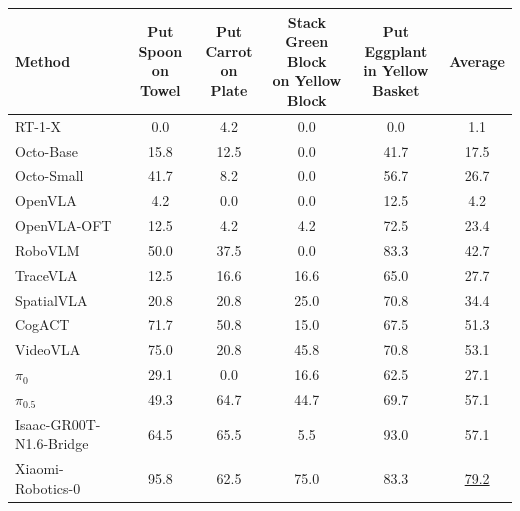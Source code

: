 \documentclass{llmxive}
\begin{document}
\begin{table}[!t]
  \centering
  \begin{adjustbox}{width=\linewidth}
  \begin{tabular}{l c c c c c}
    \toprule
    \textbf{Method}
     & \makecell[c]{\textbf{Put Spoon} \\ \textbf{on Towel}} 
     & \makecell[c]{\textbf{Put Carrot} \\ \textbf{on Plate}} 
     & \makecell[c]{\textbf{Stack Green Block} \\ \textbf{on Yellow Block}} 
     & \makecell[c]{\textbf{Put Eggplant} \\ \textbf{in Yellow Basket}} 
     & \textbf{Average} \\
    \midrule

    RT-1-X~\citep{OXE_2024_ICRA}         &  0.0  & 4.2   & 0.0   & 0.0   & 1.1 \\
    Octo-Base~\citep{Octo_2024_arXiv}       & 15.8  & 12.5  & 0.0   & 41.7  & 17.5 \\
    Octo-Small~\citep{Octo_2024_arXiv}      & 41.7  & 8.2   & 0.0   & 56.7  & 26.7 \\
    OpenVLA~\citep{OpenVLA_2024_CoRL}         & 4.2   & 0.0   & 0.0   & 12.5   & 4.2 \\
    OpenVLA-OFT~\citep{OpenVLA-OFT_2025_arXiv}     & 12.5  & 4.2  & 4.2  & 72.5  & 23.4 \\
    RoboVLM~\citep{RoboVLM_2024_arXiv}         & 50.0  & 37.5  & 0.0   & 83.3  & 42.7 \\ 
    TraceVLA~\citep{TraceVLA_2025_arXiv}        & 12.5  & 16.6  & 16.6  & 65.0  & 27.7 \\
    SpatialVLA~\citep{Spatialvla_2025_arXiv}      & 20.8  & 20.8  & 25.0  & 70.8  & 34.4 \\
    CogACT~\citep{CogACT_2024_arXiv}          & 71.7 &  50.8  & 15.0 & 67.5 & 51.3 \\
    VideoVLA~\citep{VideoVLA_2025_NeurIPS}        & 75.0 & 20.8   & 45.8 & 70.8 & 53.1 \\
    $\pi_0$~\citep{PI0_2024_arXiv}         & 29.1 & 0.0 & 16.6 & 62.5 & 27.1 \\
    $\pi_{0.5}$~\citep{PI05_2025_arXiv} & 49.3 & 64.7 & 44.7 & 69.7 & 57.1 \\
    Isaac-GR00T-N1.6-Bridge~\citep{GR00T_N1.6}   & 64.5 & 65.5 & 5.5 & 93.0 & 57.1 \\
    Xiaomi-Robotics-0~\citep{XiaomiRobotics0_2026_arxiv} &  95.8 &  62.5 &  75.0 &  83.3 &  \underline{79.2} \\
    

\end{tabular}
\end{adjustbox}
\end{table}
\end{document}
